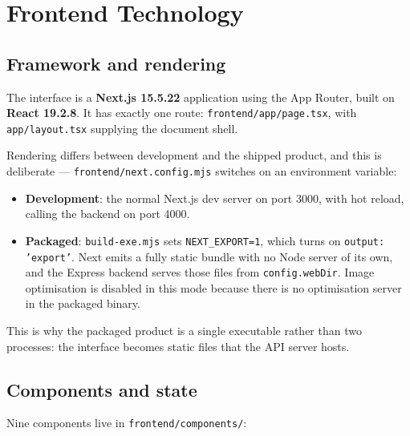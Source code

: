 \documentclass[11pt,a4paper]{report}
\newcommand{\code}[1]{\texttt{\small #1}}
\DeclareRobustCommand{\file}[1]{{\small\nolinkurl{#1}}}
\begin{document}
\chapter{Frontend Technology}
\label{sec:frontend}

\section{Framework and rendering}

The interface is a \textbf{Next.js 15.5.22} application using the App Router,
built on \textbf{React 19.2.8}. It has exactly one route: \file{frontend/app/page.tsx},
with \file{app/layout.tsx} supplying the document shell.

Rendering differs between development and the shipped product, and this is
deliberate --- \file{frontend/next.config.mjs} switches on an environment variable:

\begin{itemize}
\item \textbf{Development}: the normal Next.js dev server on port 3000, with hot
reload, calling the backend on port 4000.
\item \textbf{Packaged}: \code{build-exe.mjs} sets \code{NEXT\_EXPORT=1}, which
turns on \code{output: 'export'}. Next emits a fully static bundle with no Node
server of its own, and the Express backend serves those files from
\code{config.webDir}. Image optimisation is disabled in this mode because there
is no optimisation server in the packaged binary.
\end{itemize}

This is why the packaged product is a single executable rather than two
processes: the interface becomes static files that the API server hosts.

\section{Components and state}

Nine components live in \file{frontend/components/}:
\end{document}
